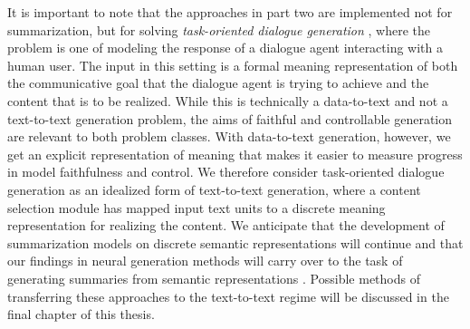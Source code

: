 It is important to note that the approaches in part two are implemented not
for summarization, but for
solving \textit{task-oriented dialogue generation} \citep{mairesse2010}, where
the problem is one of modeling the response of a dialogue agent interacting
with a human user. The input in this setting is a formal meaning
representation of both the communicative goal that the dialogue agent is
trying to achieve and the content that is to be realized. While this is
technically a data-to-text and not a text-to-text generation problem, the aims
of faithful and controllable generation are relevant to both problem classes.
With data-to-text generation, however, we get an explicit representation of
meaning that makes it easier to measure progress in model faithfulness and
control. We therefore consider task-oriented dialogue generation as an
idealized form of text-to-text generation, where a content selection module
has mapped input text units to a discrete meaning representation for realizing
the content.  We anticipate that the development of summarization models on
discrete semantic representations \citep{falke2017,liao2018} will continue and
that our findings in neural generation methods will carry over
to the task of generating summaries from semantic representations \citep{hardy2018}. Possible methods of transferring these approaches to the text-to-text
regime will be discussed in the final chapter of this thesis.
